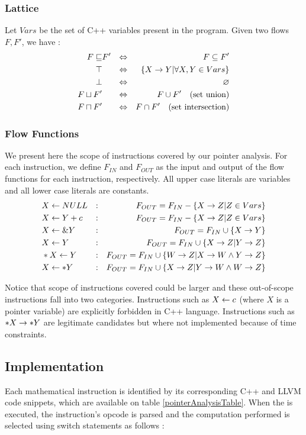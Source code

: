 \subsubsection{Lattice}
Let $Vars$ be the set of C++ variables present in the program. Given two flows $F,F'$, we have :
\begin{align*}
F \sqsubseteq & F'  & \Leftrightarrow & & F \subseteq F' \\
\top & & \Leftrightarrow & & \{ X \rightarrow Y | \forall X,Y \in Vars \}\\ 
\bot & & \Leftrightarrow & & \varnothing \\ 
F \sqcup F' & & \Leftrightarrow &  & F \cup F' \quad \text{(set union)} \\
F \sqcap F' & & \Leftrightarrow & & F \cap F' \quad \text{(set intersection)}
\end{align*}
\subsubsection{Flow Functions}
We present here the scope of instructions covered by our pointer analysis. For each instruction, we define $F_{IN}$ and $F_{OUT}$ as the input and output of the flow functions for each instruction, respectively. All upper case literals are variables and all lower case literals are constants.
{%
\begin{align*} 
& X \leftarrow NULL & : & & F_{OUT} = F_{IN} - \{X \rightarrow Z | Z \in Vars \} \\
& X \leftarrow Y + c & : & & F_{OUT} = F_{IN} - \{X \rightarrow Z | Z \in Vars \} \\
& X \leftarrow \&Y & : & & F_{OUT} = F_{IN} \cup \{X \rightarrow Y \} \\
& X \leftarrow Y & : & & F_{OUT} = F_{IN} \cup \{X \rightarrow Z | Y \rightarrow Z \} \\
& *X \leftarrow Y & : & & F_{OUT} = F_{IN} \cup \{W \rightarrow Z | X \rightarrow W \wedge Y \rightarrow Z \} \\
& X \leftarrow *Y & : & & F_{OUT} = F_{IN} \cup \{X \rightarrow Z | Y \rightarrow W \wedge W \rightarrow Z \} 
\end{align*}
}%

Notice that scope of instructions covered could be larger and these out-of-scope instructions fall into two categories. Instructions such as $X \leftarrow c$ (where $X$ is a pointer variable) are explicitly forbidden in C++ language. Instructions such as $*X \rightarrow *Y$ are legitimate candidates but where not implemented because of time constraints. 
\subsection{Implementation}
Each mathematical instruction is identified by its corresponding C++ and LLVM code snippets, which are available on table \ref{pointerAnalysisTable}. When the  is executed, the instruction's opcode is parsed and the computation performed is selected using switch statements as follows :

